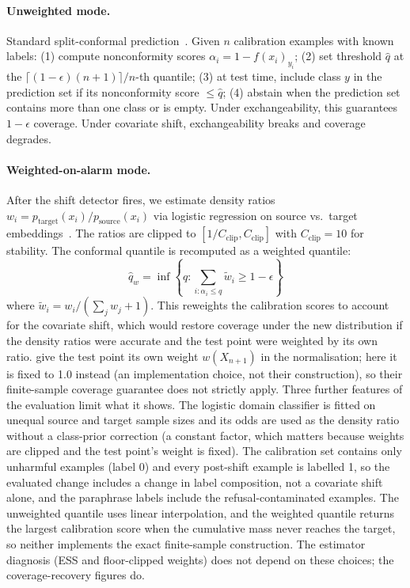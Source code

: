 \documentclass{article}
\begin{document}
\paragraph{Unweighted mode.} Standard split-conformal prediction~\citep{vovk2005algorithmic}. Given $n$ calibration examples with known labels: (1) compute nonconformity scores $\alpha_i = 1 - f(x_i)_{y_i}$; (2) set threshold $\hat{q}$ at the $\lceil(1-\epsilon)(n+1)\rceil/n$-th quantile; (3) at test time, include class $y$ in the prediction set if its nonconformity score $\leq \hat{q}$; (4) abstain when the prediction set contains more than one class or is empty. Under exchangeability, this guarantees $1-\epsilon$ coverage. Under covariate shift, exchangeability breaks and coverage degrades.

\paragraph{Weighted-on-alarm mode.} After the shift detector fires, we estimate density ratios $w_i = p_{\text{target}}(x_i) / p_{\text{source}}(x_i)$ via logistic regression on source vs.\ target embeddings~\citep{tibshirani2019conformal}. The ratios are clipped to $[1/C_{\text{clip}}, C_{\text{clip}}]$ with $C_{\text{clip}} = 10$ for stability. The conformal quantile is recomputed as a weighted quantile:
\begin{equation}
\hat{q}_w = \inf\left\{q : \sum_{i: \alpha_i \leq q} \tilde{w}_i \geq 1 - \epsilon\right\}
\end{equation}
where $\tilde{w}_i = w_i / (\sum_j w_j + 1)$. This reweights the calibration scores to account for the covariate shift, which would restore coverage under the new distribution if the density ratios were accurate and the test point were weighted by its own ratio. \citet{tibshirani2019conformal} give the test point its own weight $w(X_{n+1})$ in the normalisation; here it is fixed to 1.0 instead (an implementation choice, not their construction), so their finite-sample coverage guarantee does not strictly apply. Three further features of the evaluation limit what it shows. The logistic domain classifier is fitted on unequal source and target sample sizes and its odds are used as the density ratio without a class-prior correction (a constant factor, which matters because weights are clipped and the test point's weight is fixed). The calibration set contains only unharmful examples (label 0) and every post-shift example is labelled 1, so the evaluated change includes a change in label composition, not a covariate shift alone, and the paraphrase labels include the refusal-contaminated examples. The unweighted quantile uses linear interpolation, and the weighted quantile returns the largest calibration score when the cumulative mass never reaches the target, so neither implements the exact finite-sample construction. The estimator diagnosis (ESS and floor-clipped weights) does not depend on these choices; the coverage-recovery figures do.
\end{document}
